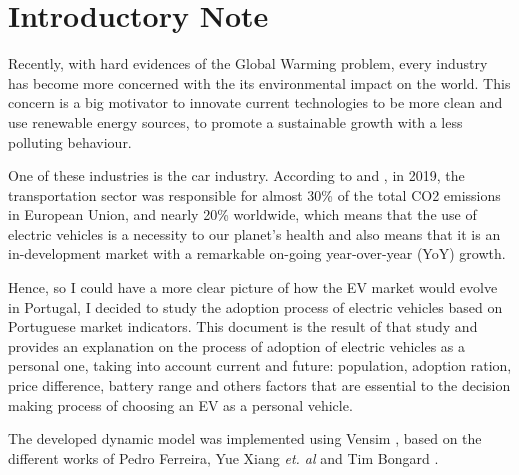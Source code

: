 \section{Introductory Note} \label{section:intro}
Recently, with hard evidences of the Global Warming problem, every industry has become more concerned with the its environmental impact on the world. This concern is a big motivator to innovate current technologies to be more clean and use renewable energy sources, to promote a sustainable growth with a less polluting behaviour.

One of these industries is the car industry. According to \cite{Weiss00onthe} and \cite{eu-parliament}, in 2019, the transportation sector was responsible for almost 30\% of the total CO2 emissions in European Union, and nearly 20\% worldwide, which means that the use of electric vehicles is a necessity to our planet's health and also means that it is an in-development market with a remarkable on-going year-over-year (YoY) growth.

Hence, so I could have a more clear picture of how the EV market would evolve in Portugal, I decided to study the adoption process of electric vehicles based on Portuguese market indicators. This document is the result of that study and provides an explanation on the process of adoption of electric vehicles as a personal one, taking into account current and future: population, adoption ration, price difference, battery range and others factors that are essential to the decision making process of choosing an EV as a personal vehicle.

The developed dynamic model was implemented using Vensim \cite{vensim, mod-helper, vensim-youtube}, based on the different works of Pedro Ferreira, Yue Xiang \textit{et. al} and Tim Bongard \cite{thesis-base, pedro-report, yue-xiang-paper}.

\clearpage
